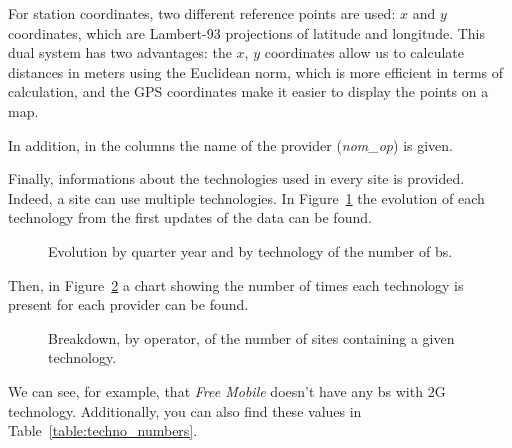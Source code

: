 \documentclass[lettersize,journal,english]{IEEEtran}
\begin{document}
        For station coordinates, two different reference points are used: $x$ and $y$ coordinates, which are Lambert-93 projections of latitude and longitude.
        This dual system has two advantages: the $x$, $y$ coordinates allow us to calculate distances in meters using the Euclidean norm, which is more efficient in terms of calculation, and the GPS coordinates make it easier to display the points on a map.

        In addition, in the columns the name of the provider (\textsl{nom\_op}) is given.

        Finally, informations about the technologies used in every site is provided. Indeed, a site can use multiple technologies.
        In Figure~\ref{fig:data_evolution} the evolution of each technology from the first updates of the data can be found.
        \begin{figure}
            \centering
            \caption{Evolution by quarter year and by technology of the number of \acrshort{bs}.}
            \label{fig:data_evolution}
        \end{figure}
        Then, in Figure~\ref{fig:data_technos} a chart showing the number of times each technology is present for each provider can be found.
        \begin{figure}
            \centering
            \caption{Breakdown, by operator, of the number of sites containing a given technology.}
            \label{fig:data_technos}
        \end{figure}
        We can see, for example, that \emph{Free Mobile} doesn't have any \acrshort{bs} with $2$G technology. Additionally, you can also find these values in Table~\ref{table:techno_numbers}.
\end{document}
